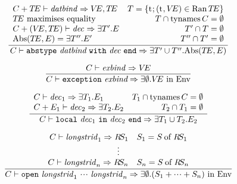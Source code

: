 \begin{equation}	%
\label{abstypedec-rule}
\frac{\begin{array}{lr}
      \C+\TE\ts\datbind\ra\VE,\TE &
      \T = \{\t; (\t, \VE) \in\Ran\TE\} \\
      \mbox{$\TE$ maximises equality} &
      \T \cap \TyNamesFcn \C = \emptyset\\
      \C+(\VE,\TE)\ts\dec\ra\EXISTS{\T'}{\E} & 
      \T' \cap \T = \emptyset \\
      \Abs(\TE,E) = \EXISTS{\T''}{\E'} &
      \T'' \cap \T' = \emptyset 
      \end{array}
     }
     {\C\ts\abstypedec\ra\EXISTS{\T'\cup\T''}{\Abs(\TE,\E)}}
\end{equation}

\begin{equation}	%
\label{exceptiondec-rule}
\frac{\C\ts\exnbind\ra\VE }
     {\C\ts\exceptiondec\ra\EXISTS{\emptyset}{\VE\ \In\ \Env}}
\end{equation}

\begin{equation}	%
\frac{\begin{array}{lr}
      \C\ts\dec_1\ra\EXISTS{\T_1}{\E_1} &
      \T_1 \cap \TyNamesFcn \C = \emptyset \\
      \C+\E_1\ts\dec_2\ra\EXISTS{\T_2}{\E_2} &
      \T_2 \cap \T_1  = \emptyset
      \end{array}}
     {\C\ts\localdec\ra\EXISTS{\T_1\cup\T_2}{\E_2}}
     \index{28.3}
\end{equation}

\begin{equation}                %
\frac{\begin{array}{c}
       \C\ts\longstrid_1\ra\RS_1  \quad \S_1 = \of{\S}{\RS_1}\\
            \vdots \\
       \C\ts\longstrid_n\ra\RS_n \quad \S_n = \of{\S}{\RS_n}
      \end{array}}
     {\C\ts\opendec\ra\EXISTS{\emptyset}{ (\S_1 + \cdots + \S_n)\ \In\ \Env }}
\end{equation}


